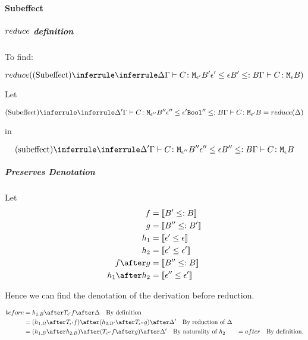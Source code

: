 {        \paragraph{Subeffect}
        \subparagraph{$reduce$ definition}
        To find:

        \begin{equation}
            \reduce(\ntreeruleI{Subeffect}{\treeruleI{\D}{\gtyperelation{C}{\M{\e'}{B'}}}}{\e'\subeffect\e}{ B'\subtype B}{\gtyperelation{C}{\meb}})
        \end{equation}

        Let 

        \begin{equation}
            \ntreeruleI{Subeffect}{
                \treeruleI{\D'}{\gtyperelation{C}{\M{\e''}{B''}}}
                }{
                \e'' \subeffect \e'
                }{
                \B'' \subtype B
            }{
                \gtyperelation{C}{\M{\e'}{B}}
            } = \reduce(\D)
        \end{equation}

        in

        \begin{equation}
            \ntreeruleI{subeffect}{
                \treeruleI{\D'}{\gtyperelation{C}{\M{\e''}{B''}}}
                }{
                \e'' \subeffect \e
                }{
                B'' \subtype B
            }{
                \gtyperelation{C}{\meb}
            }
        \end{equation}
        \subparagraph{Preserves Denotation}
            Let
            \begin{align}
                f & = \deno{B' \subtype B}\\
                g & = \deno{B'' \subtype B'}\\
                h_1 & = \deno{\e' \subeffect \e}\\
                h_2 & = \deno{\e' \subeffect \e'}\\
                f\after g & = \deno{B'' \subtype B}\\
                h_1\after h_2 & = \deno{\e'' \subeffect \e'}\\
            \end{align}

            Hence we can find the denotation of the derivation before reduction.

            \begin{align}
                before & = h_{1, B} \after \T{\e'}{f} \after \D \qt{By definition}\\
                & = (h_{1, B} \after \T{\e'}{f}) \after (h_{2, B'} \after \T{\e''}{g}) \after \D' \qt{By reduction of $\D$} \\
                & = (h_{1, B}\after h_{2, B}) \after (\T{\e''}{f\after g})\after \D'\qt{By naturality of $h_2$}
                & = after \qt{By definition.}
            \end{align}


}
